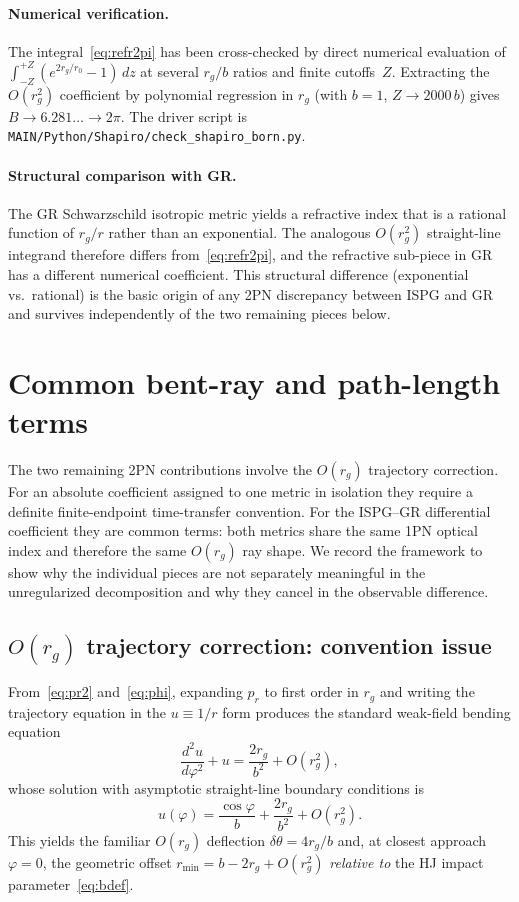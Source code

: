 \documentclass[11pt]{article}
\begin{document}
\paragraph{Numerical verification.}
The integral~\eqref{eq:refr2pi} has been cross-checked by
direct numerical evaluation of
$\int_{-Z}^{+Z}(e^{2r_g/r_0}-1)\,dz$ at several $r_g/b$ ratios
and finite cutoffs~$Z$.  Extracting the $O(r_g^2)$ coefficient
by polynomial regression in $r_g$ (with $b=1$, $Z\to 2000\,b$)
gives $B\to 6.281\ldots\to 2\pi$.  The driver script is
\texttt{MAIN/Python/Shapiro/check\_shapiro\_born.py}.

\paragraph{Structural comparison with GR.}
The GR Schwarzschild isotropic metric yields a refractive
index that is a rational function of $r_g/r$ rather than an
exponential.  The analogous $O(r_g^2)$ straight-line integrand
therefore differs from~\eqref{eq:refr2pi}, and the refractive
sub-piece in GR has a different numerical coefficient.  This
structural difference (exponential vs.\ rational) is the
basic origin of any 2PN discrepancy between ISPG and GR and
survives independently of the two remaining pieces below.

\section{Common bent-ray and path-length terms}\label{sec:open}

The two remaining 2PN contributions involve the
$O(r_g)$ trajectory correction.  For an absolute coefficient
assigned to one metric in isolation they require a definite
finite-endpoint time-transfer convention.  For the ISPG--GR
differential coefficient they are common terms: both metrics
share the same 1PN optical index and therefore the same
$O(r_g)$ ray shape.  We record the framework to show why the
individual pieces are not separately meaningful in the
unregularized decomposition and why they cancel in the
observable difference.

\subsection{$O(r_g)$ trajectory correction: convention issue}

From~\eqref{eq:pr2} and~\eqref{eq:phi}, expanding $p_r$ to first
order in $r_g$ and writing the trajectory equation in the
$u\equiv 1/r$ form produces the standard weak-field bending
equation
\begin{equation}
\frac{d^2u}{d\varphi^2}+u=\frac{2r_g}{b^2}+O(r_g^2),
\label{eq:ubending}
\end{equation}
whose solution with asymptotic straight-line boundary
conditions is
\begin{equation}
u(\varphi)=\frac{\cos\varphi}{b}+\frac{2r_g}{b^2}+O(r_g^2).
\label{eq:usol}
\end{equation}
This yields the familiar $O(r_g)$ deflection
$\delta\theta=4r_g/b$ and, at closest approach $\varphi=0$, the
geometric offset $r_{\min}=b-2r_g+O(r_g^2)$ \emph{relative to}
the HJ impact parameter~\eqref{eq:bdef}.
\end{document}
